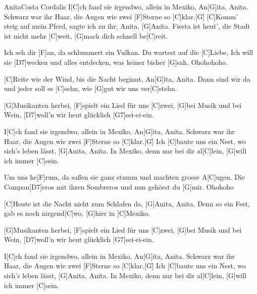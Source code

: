 \documentclass[../main.tex]{subfiles}
\begin{document}
\begin{song}{Anita}{Costa Cordalis}{}        
I[C]ch fand sie irgendwo, allein in Mexiko, An[G]ita, Anita.
Schwarz war ihr Haar, die Augen wie zwei [F]Sterne so [C]klar.[G]{\h}
[C]Komm' steig auf mein Pferd, sagte ich zu ihr, Anita, [G]Anita.
Fiesta ist heut', die Stadt ist nicht mehr [C]weit,
[G]mach dich schnell be[C]reit.

Ich seh dir [F]an, da schlummert ein Vulkan. Du wartest auf die [C]Liebe,
Ich will sie [D7]wecken und alles entdecken, was keiner bisher [G]sah. Ohohohoho.

[C]Reite wie der Wind, bis die Nacht beginnt, An[G]ita, Anita.
Dann sind wir da und jeder soll es [C]sehn, wie [G]gut wir uns ver[C]stehn.

[G]Musikanten herbei, [F]spielt ein Lied für uns [C]zwei,
[G]bei Musik und bei Wein, [D7]woll'n wir heut glücklich [G7]sei-ei-ein.

I[C]ch fand sie irgendwo, allein in Mexiko, An[G]ita, Anita.
Schwarz war ihr Haar, die Augen wie zwei [F]Sterne so [C]klar.[G]{\h}
Ich [C]baute uns ein Nest, wo sich's leben lässt, [G]Anita, Anita.
In Mexiko, denn nur bei dir al[C]lein, [G]will ich immer [C]sein.

Um uns he[F]rum, da saßen sie ganz stumm und machten grosse A[C]ugen.
Die Compan[D7]eros mit ihren Sombreros  und nun gehörst du [G]mir. Ohohoho

[C]Heute ist die Nacht nicht zum Schlafen da, [G]Anita, Anita.
Denn so ein Fest, gab es noch nirgend[C]wo, [G]hier in [C]Mexiko.

[G]Musikanten herbei, [F]spielt ein Lied für uns [C]zwei,
[G]bei Musik und bei Wein, [D7]woll'n wir heut glücklich [G7]sei-ei-ein.

I[C]ch fand sie irgendwo, allein in Mexiko, An[G]ita, Anita.
Schwarz war ihr Haar, die Augen wie zwei [F]Sterne so [C]klar.[G]{\h}
Ich [C]baute uns ein Nest, wo sich's leben lässt, [G]Anita, Anita.
In Mexiko, denn nur bei dir al[C]lein, [G]will ich immer [C]sein.
\end{song}
\end{document}
